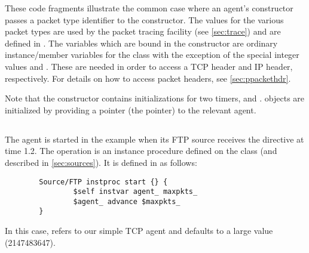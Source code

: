 These code fragments illustrate the common case where an agent's
constructor passes a packet type identifier to the 
constructor.
The values for the various packet types are used by the packet tracing
facility (see \ref{sec:trace}) and are defined in .
The variables which are bound in the  constructor
are ordinary instance/member variables for the class
with the exception of the special integer values 
and .
These are needed in order to access a TCP header and IP header,
respectively.
For details on how to access packet headers, see \ref{sec:ppackethdr}.

Note that the  constructor contains initializations for
two timers,  and .   
objects are initialized by providing a pointer (the  pointer) to
the relevant agent.

\subsection{}

The  agent is started in the example when its
FTP source receives the  directive at time 1.2.
The  operation is an instance procedure defined on the
 class (and described in \ref{sec:sources}).
It is defined in  as follows:
\begin{small}
\begin{verbatim}
        Source/FTP instproc start {} {
                $self instvar agent_ maxpkts_
                $agent_ advance $maxpkts_
        }
\end{verbatim}
\end{small}
In this case,  refers to our simple TCP agent and
 defaults to a large value (2147483647).

